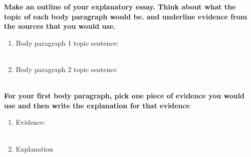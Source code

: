 \documentclass[12pt]{article}
\begin{document}
\begin{tcolorbox}[colframe=black!60, colback=white, 
coltitle=black, colbacktitle=black!15, fonttitle=\bfseries\Large, 
title=Guided Practice, halign title=center, left=10pt, right=10pt, top=10pt, bottom=15pt]
\textbf{Make an outline of your explanatory essay. Think about what the topic of each body paragraph would be. and underline evidence from the sources that you would use.}
\begin{enumerate}[itemsep=3em] %
    \item Body paragraph 1 topic sentence:
    \\[0.8cm] \underline{\hspace{14.3cm}}  
    \\[0.8cm] \underline{\hspace{14.3cm}} 
    \item Body paragraph 2 topic sentence
     \\[0.8cm] \underline{\hspace{14.3cm}}  
    \\[0.8cm] \underline{\hspace{14.3cm}} 


\vspace{1.5em}\end{enumerate}
\textbf{For your first body paragraph, pick one piece of evidence you would use and then write the explanation for that evidence}
\begin{enumerate}[itemsep=3em] %
    \item Evidence:
    \\[0.8cm] \underline{\hspace{14.3cm}}  
    \\[0.8cm] \underline{\hspace{14.3cm}} 
    \item Explanation
     \\[0.8cm] \underline{\hspace{14.3cm}}  
    \\[0.8cm] \underline{\hspace{14.3cm}} 
    \end{enumerate}
\end{tcolorbox}
\vspace{2em}
\end{document}
